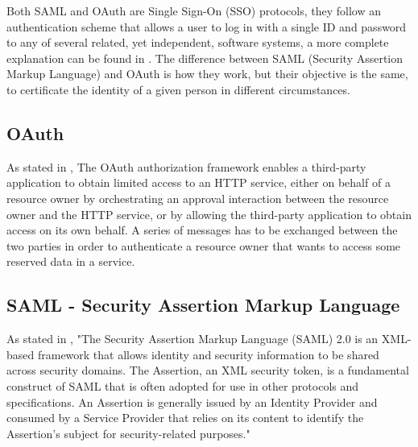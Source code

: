 Both \Gls{SAML} and \Gls{OAuth} are Single Sign-On (SSO) protocols, they follow an authentication scheme that allows a user to log in with a single ID and password to any of several related, yet independent, software systems, a more complete explanation can be found in \cite{claudio_grisenti}. 
The difference between \Gls{SAML} (Security Assertion Markup Language) and \Gls{OAuth} is how they work, but their objective is the same, to certificate the identity of a given person in different circumstances.

\subsection{OAuth}
As stated in \cite{ietf_oauth2}, The \Gls{OAuth} authorization framework enables a third-party application to obtain limited access to an HTTP service, either on behalf of a resource owner by orchestrating an approval interaction between the resource owner and the HTTP service, or by allowing the third-party application to obtain access on its own behalf.
A series of messages has to be exchanged between the two parties in order to authenticate a resource owner that wants to access some reserved data in a service.

\subsection{SAML - Security Assertion Markup Language}
As stated in \cite{ietf_SAML}, "The Security Assertion Markup Language (\Gls{SAML}) 2.0 is an XML-based framework that allows identity and security information to be shared across security domains. The Assertion, an XML security token, is a fundamental construct of \Gls{SAML} that is often adopted for use in other protocols and specifications. An Assertion is generally issued by an Identity Provider and consumed by a Service Provider that relies on its content to identify the Assertion's subject for security-related purposes."





